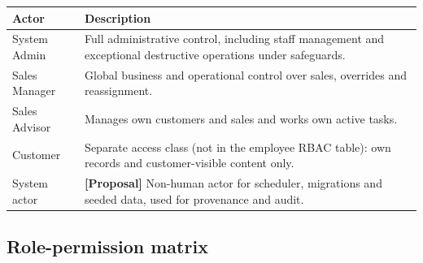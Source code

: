\documentclass[11pt,a4paper]{article}
\newcommand{\tagprop}{\textcolor{orange!80!black}{\textbf{[Proposal]}}}
\begin{document}
\begin{longtable}{@{}L{3.4cm}L{12.4cm}@{}}
	\toprule
	\textbf{Actor} & \textbf{Description}                                                                                             \\
	\midrule
	\endhead
	System Admin   & Full administrative control, including staff management and exceptional destructive operations under safeguards. \\
	Sales Manager  & Global business and operational control over sales, overrides and reassignment.                                  \\
	Sales Advisor  & Manages own customers and sales and works own active tasks.                                                      \\
	Customer       & Separate access class (not in the employee RBAC table): own records
	and customer-visible content only.                                                                                                \\
	System actor   & \tagprop{} Non-human actor for scheduler, migrations and seeded data, used for provenance and audit.             \\
	\bottomrule
\end{longtable}

\subsection{Role-permission matrix}
\end{document}
